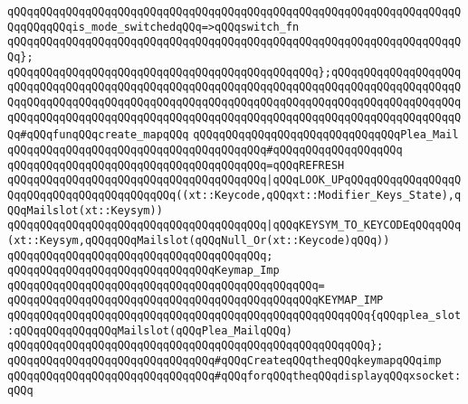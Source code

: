\verb|qQQqqQQqqQQqqQQqqQQqqQQqqQQqqQQqqQQqqQQqqQQqqQQqqQQqqQQqqQQqqQQqqQQqqQQqqQQqqQQqis_mode_switchedqQQq=>qQQqswitch_fn|\newline
\verb|qQQqqQQqqQQqqQQqqQQqqQQqqQQqqQQqqQQqqQQqqQQqqQQqqQQqqQQqqQQqqQQqqQQqqQQq};|\newline
\verb|qQQqqQQqqQQqqQQqqQQqqQQqqQQqqQQqqQQqqQQqqQQqqQQq};qQQqqQQqqQQqqQQqqQQqqQQqqQQqqQQqqQQqqQQqqQQqqQQqqQQqqQQqqQQqqQQqqQQqqQQqqQQqqQQqqQQqqQQqqQQqqQQqqQQqqQQqqQQqqQQqqQQqqQQqqQQqqQQqqQQqqQQqqQQqqQQqqQQqqQQqqQQqqQQqqQQqqQQqqQQqqQQqqQQqqQQqqQQqqQQqqQQqqQQqqQQqqQQqqQQqqQQqqQQqqQQqqQQqqQQq#qQQqfunqQQqcreate_mapqQQq|\newline
\newline
\newline
\verb|qQQqqQQqqQQqqQQqqQQqqQQqqQQqqQQqPlea_Mail|\newline
\verb|qQQqqQQqqQQqqQQqqQQqqQQqqQQqqQQqqQQqqQQq#qQQqqQQqqQQqqQQqqQQq|\newline
\verb|qQQqqQQqqQQqqQQqqQQqqQQqqQQqqQQqqQQqqQQq=qQQqREFRESH|\newline
\verb|qQQqqQQqqQQqqQQqqQQqqQQqqQQqqQQqqQQqqQQq|\verb#|qQQqLOOK_UPqQQqqQQqqQQqqQQqqQQqqQQqqQQqqQQqqQQqqQQqqQQq((xt::Keycode,qQQqxt::Modifier_Keys_State),qQQqMailslot(xt::Keysym))#\newline
\verb|qQQqqQQqqQQqqQQqqQQqqQQqqQQqqQQqqQQqqQQq|\verb#|qQQqKEYSYM_TO_KEYCODEqQQqqQQq(xt::Keysym,qQQqqQQqMailslot(qQQqNull_Or(xt::Keycode)qQQq))#\newline
\verb|qQQqqQQqqQQqqQQqqQQqqQQqqQQqqQQqqQQqqQQq;|\newline
\newline
\newline
\verb|qQQqqQQqqQQqqQQqqQQqqQQqqQQqqQQqKeymap_Imp|\newline
\verb|qQQqqQQqqQQqqQQqqQQqqQQqqQQqqQQqqQQqqQQqqQQqqQQq=|\newline
\verb|qQQqqQQqqQQqqQQqqQQqqQQqqQQqqQQqqQQqqQQqqQQqqQQqKEYMAP_IMP|\newline
\verb|qQQqqQQqqQQqqQQqqQQqqQQqqQQqqQQqqQQqqQQqqQQqqQQqqQQqqQQq{qQQqplea_slot:qQQqqQQqqQQqqQQqMailslot(qQQqPlea_MailqQQq)|\newline
\verb|qQQqqQQqqQQqqQQqqQQqqQQqqQQqqQQqqQQqqQQqqQQqqQQqqQQqqQQq};|\newline
\newline
\newline
\verb|qQQqqQQqqQQqqQQqqQQqqQQqqQQqqQQq#qQQqCreateqQQqtheqQQqkeymapqQQqimp|\newline
\verb|qQQqqQQqqQQqqQQqqQQqqQQqqQQqqQQq#qQQqforqQQqtheqQQqdisplayqQQqxsocket:qQQq|\newline
